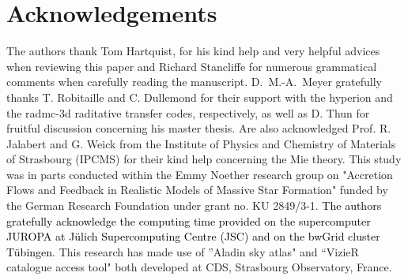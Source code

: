 \documentclass[useAMS,usenatbib]{mn2e}
\begin{document}


\section*{Acknowledgements}


The authors thank Tom Hartquist, for his kind help and very helpful advices 
when reviewing this paper and Richard Stancliffe for numerous 
grammatical comments when carefully reading the manuscript.
%
D.~M.-A.~Meyer gratefully thanks T. Robitaille and C. Dullemond for their 
support with the {\sc hyperion} and the {\sc radmc-3d} raditative 
transfer codes, respectively, as well as D. Thun for fruitful discussion concerning his master thesis.
%
Are also acknowledged Prof. R. Jalabert and G. Weick from the Institute of 
Physics and Chemistry of Materials of Strasbourg (IPCMS) for their kind help 
concerning the Mie theory. 
% 
This study was in parts conducted within the Emmy Noether research group on
"Accretion Flows and Feedback in Realistic Models of Massive Star Formation" 
funded by the German Research Foundation under grant no. KU 2849/3-1.  
%
\textcolor{black}{
The authors gratefully acknowledge the computing time provided on the 
supercomputer JUROPA at J\" ulich Supercomputing Centre (JSC) 
and on the bwGrid cluster T\" ubingen. 
}
%
This research has made use of ''Aladin sky atlas" and ``VizieR catalogue access 
tool" both developed at CDS, Strasbourg Observatory, France. 
    
    





\footnotesize{

}


\end{document}
